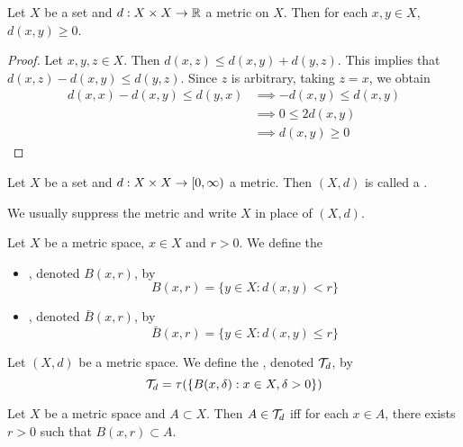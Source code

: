 \documentclass{book}
\begin{document}
\begin{ex} \lex{}
	Let $X$ be a set and $d: X \times X \rightarrow \mathbb{R}$ a metric on $X$. Then for each $x,y \in X$, $d(x,y) \geq 0$. 
\end{ex}

\begin{proof}
	Let $x, y, z \in X$. Then $d(x,z) \leq d(x, y) + d(y,z)$. This implies that $d(x,z) - d(x, y) \leq d(y, z)$. Since $z$ is arbitrary, taking $z=x$, we obtain 
	\begin{align*}
		d(x,x) - d(x, y) \leq d(y, x)
		& \implies - d(x, y) \leq d(x, y) \\
		& \implies 0 \leq 2 d(x,y) \\
		& \implies d(x,y) \geq 0
	\end{align*}
\end{proof}	

\begin{defn} \ld{}
	Let $X$ be a set and $d: X \times X \rightarrow [0,\infty)$ a metric. Then $(X, d)$ is called a .
\end{defn}	

\begin{note}
	We usually suppress the metric and write $X$ in place of $(X, d)$.
\end{note}	

\begin{defn}
	Let $X$ be a metric space, $x \in X$ and $r > 0$. We define the 
	\begin{itemize}
		\item {}, denoted $B(x, r)$, by $$B(x, r) = \{y \in X: d(x,y) < r\}$$
		\item {}, denoted $\bar{B}(x, r)$, by $$\bar{B}(x, r) = \{y \in X: d(x,y) \leq r\}$$
	\end{itemize}
\end{defn}

\begin{defn} 
	Let $(X,d)$ be a metric space. We define the , denoted $\mathcal{T}_d$, by $$\mathcal{T}_d = \tau(\{B(x, \delta): x \in X, \delta >0\})$$
\end{defn}

\begin{ex}
\end{ex}

\begin{ex}
	Let $X$ be a metric space and $A \subset X$. Then $A \in \mathcal{T}_d$ iff for each $x \in A$, there exists $r > 0$ such that $B(x, r) \subset A$.
\end{ex}
\end{document}
